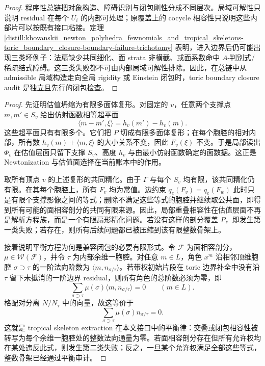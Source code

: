 \begin{proof}
程序性总链把对象构造、障碍识别与闭包刚性分成不同层次。局域可解性只说明 residual 在每个 \(U_i\) 的内部可处理；原覆盖上的 cocycle 相容性只说明这些内部片可以按既有接口粘接。定理 \ref{distill:khovanskii_newton_polyhedra_fewnomials_and_tropical_skeletons-toric_boundary_closure-boundary-failure-trichotomy} 表明，进入边界后仍可能出现三类坏例子：法扇缺少共同细化、面 strata 非横截、或面系数命中 \(A\)-判别式/稀疏结式障碍。这三类失败都不可由内部局域可解性排除。因此，在总链中从 admissible 局域构造走向全局 rigidity 或 Einstein 闭包时，toric boundary closure audit 是独立且先行的闭包检查。
\end{proof}

\begin{proof}
先证明估值坍缩为有限多面体复形。对固定的 \(v\)，任意两个支撑点 \(m,m'\in S_v\) 给出仿射函数相等超平面
\[
\langle m-m',\xi\rangle=h_v(m')-h_v(m).
\]
这些超平面只有有限多个。它们把 \(P\) 切成有限多面体复形；在每个胞腔的相对内部，所有数
\(h_v(m)+\langle m,\xi\rangle\) 的大小关系不变，因此 \(F_v(\xi)\) 不变。于是局部读出 \(\Phi_v\) 在估值层面只留下支撑 \(S_v\)、高度 \(h_v\) 与由最小仿射函数确定的面数据。这正是 Newtonization 与估值面选择在当前账本中的作用。

取所有顶点 \(v\) 的上述复形的共同精化。由于 \(\Gamma\) 与每个 \(S_v\) 均有限，该共同精化仍有限。在其每个胞腔上，所有 \(F_v\) 均为常值。边约束
\(q_e(F_v)=q_e(F_w)\)
此时只是有限个支撑影像之间的等式；删除不满足这些等式的胞腔并继续取公共面，即得到所有可能的面相容剖分的共同有限来源。因此，局部重叠相容性在估值层面不再是解析方程族，而是一个有限扇形精化问题。若没有这样的剖分覆盖 \(P\)，即发生第一类失败；若存在，则所有后续问题都已被压缩到该有限整数骨架上。

接着说明平衡方程为何是兼容闭包的必要有限形式。令 \(\mathcal F\) 为面相容剖分，\(\mu\in\mathcal W(\mathcal F)\)，并令 \(\tau\) 为内部余维一胞腔。对任意 \(m\in L\)，角色 \(x^m\) 沿相邻顶维胞腔 \(\sigma\supset\tau\) 的一阶法向阶数为 \(\langle m,n_{\sigma/\tau}\rangle\)。若带权初始片段在 toric 边界补全中没有沿 \(\tau\) 留下未抵消的一阶边界 residual，则所有角色的总阶数必须为零，即
\[
\sum_{\sigma\supset\tau}\mu(\sigma)\langle m,n_{\sigma/\tau}\rangle=0\qquad(m\in L).
\]
格配对分离 \(N/N_\tau\) 中的向量，故这等价于
\[
\sum_{\sigma\supset\tau}\mu(\sigma)n_{\sigma/\tau}=0.
\]
这就是 tropical skeleton extraction 在本文接口中的平衡律：交叠或闭包相容性被转写为每个余维一胞腔处的整数法向通量为零。若面相容剖分存在但所有允许权均在某处违反此式，则发生第二类失败；反之，一旦某个允许权满足全部这些等式，整数骨架已经通过平衡审计。


\end{proof}
